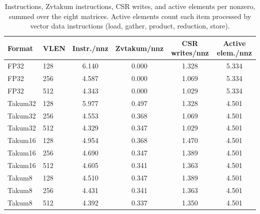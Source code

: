 \begin{table}[t]
\caption{Instructions, Zvtakum instructions, CSR writes, and active elements per nonzero, summed over the eight matrices. Active elements count each item processed by vector data instructions (load, gather, product, reduction, store).}
\label{tab:contagens}
\centering
\footnotesize
\begin{tabular}{@{}llcccc@{}}
\toprule
Format & VLEN & Instr./nnz & Zvtakum/nnz & CSR writes/nnz & Active elem./nnz \\
\midrule
FP32 & 128 & 6.140 & 0.000 & 1.328 & 5.334 \\
FP32 & 256 & 4.587 & 0.000 & 1.069 & 5.334 \\
FP32 & 512 & 4.343 & 0.000 & 1.029 & 5.334 \\
\midrule
Takum32 & 128 & 5.977 & 0.497 & 1.328 & 4.501 \\
Takum32 & 256 & 4.553 & 0.368 & 1.069 & 4.501 \\
Takum32 & 512 & 4.329 & 0.347 & 1.029 & 4.501 \\
\midrule
Takum16 & 128 & 4.954 & 0.368 & 1.470 & 4.501 \\
Takum16 & 256 & 4.690 & 0.347 & 1.389 & 4.501 \\
Takum16 & 512 & 4.605 & 0.341 & 1.363 & 4.501 \\
\midrule
Takum8 & 128 & 4.510 & 0.347 & 1.389 & 4.501 \\
Takum8 & 256 & 4.431 & 0.341 & 1.363 & 4.501 \\
Takum8 & 512 & 4.392 & 0.337 & 1.350 & 4.501 \\
\bottomrule
\end{tabular}
\end{table}
